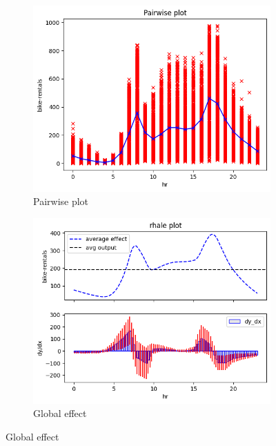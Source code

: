 \documentclass[
twocolumn,
]{ceurart}
\begin{document}
\begin{figure}
  \centering
  \begin{subfigure}[t]{0.24\textwidth}
  \centering
  \includegraphics[width=\linewidth]{figures/running_example/01_bike_sharing_dataset_pairwise_plot.png}
  \caption{Pairwise plot}
  \label{subfig:pairwise}
  \end{subfigure}
  \begin{subfigure}[t]{0.24\textwidth}
  \centering
  \includegraphics[width=\linewidth]{figures/running_example/01_bike_sharing_dataset_23_1.png}
  \caption{Global effect}
  \label{subfig:global}
  \end{subfigure}

\end{figure}
\end{document}
